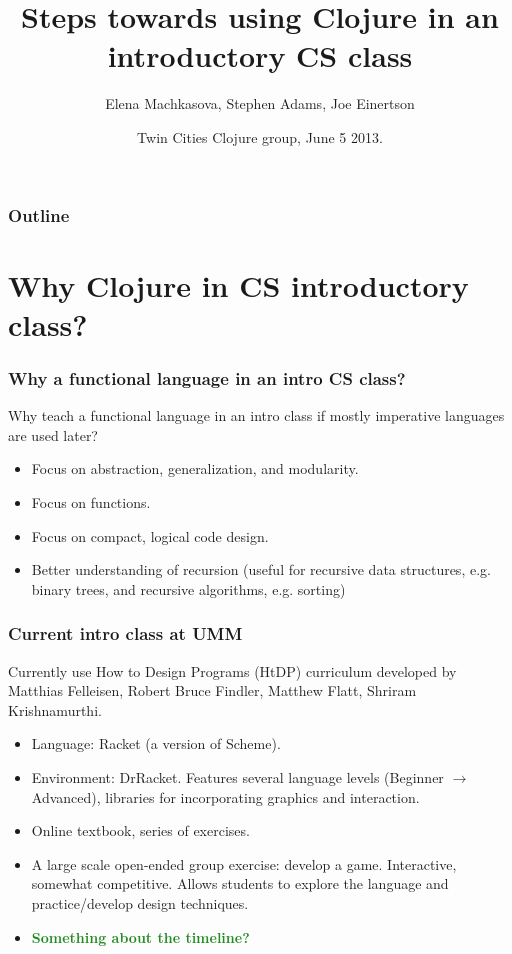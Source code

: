 \documentclass{beamer}
\newcommand{\allcomments}[1]{{#1}}
\newcommand{\elenacomment}[1]{{\bf \textcolor{ForestGreen}{\allcomments{{#1}}}}}
\begin{document}
\title{Steps towards using Clojure in an introductory CS class}
\author{Elena Machkasova, Stephen Adams, Joe Einertson}
\date[]  
{ Twin Cities Clojure group, June 5 2013.}

\begin{frame}
  \titlepage
\end{frame}

\begin{frame}

  \frametitle{Outline}
\tableofcontents
\end{frame}


\section{Why Clojure in CS introductory class?}


\begin{frame}
  \frametitle{Why a functional language in an intro CS class?}
Why teach a functional language in an intro class if mostly imperative languages are used later? 
\begin{itemize}
\item Focus on abstraction, generalization, and modularity. 
\item Focus on functions.
\item Focus on compact, logical code design. 
\item Better understanding of recursion (useful for recursive data structures, e.g. binary trees, and recursive algorithms, e.g. sorting)
\end{itemize}
\end{frame}


\begin{frame}
  \frametitle{Current intro class at UMM}
Currently use How to Design Programs (HtDP) curriculum developed by Matthias Felleisen, Robert Bruce Findler, Matthew Flatt, Shriram Krishnamurthi. 
\begin{itemize}
\item Language: Racket (a version of Scheme).
\item Environment: DrRacket. Features several language levels (Beginner $\to$ Advanced), libraries for incorporating graphics and interaction. 
\item Online textbook, series of exercises.
\item A large scale open-ended group exercise: develop a game. Interactive, somewhat competitive. Allows students to explore the language and practice/develop design techniques. 
\item \elenacomment{Something about the timeline?}
\end{itemize}
\end{frame}
\end{document}
